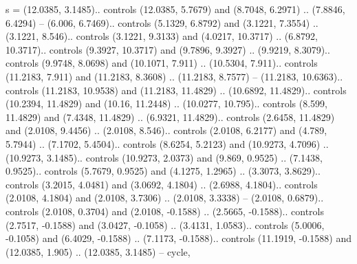 {s} = {(12.0385, 3.1485).. controls (12.0385, 5.7679) and (8.7048, 6.2971) .. (7.8846, 6.4294) -- (6.006, 6.7469).. controls (5.1329, 6.8792) and (3.1221, 7.3554) .. (3.1221, 8.546).. controls (3.1221, 9.3133) and (4.0217, 10.3717) .. (6.8792, 10.3717).. controls (9.3927, 10.3717) and (9.7896, 9.3927) .. (9.9219, 8.3079).. controls (9.9748, 8.0698) and (10.1071, 7.911) .. (10.5304, 7.911).. controls (11.2183, 7.911) and (11.2183, 8.3608) .. (11.2183, 8.7577) -- (11.2183, 10.6363).. controls (11.2183, 10.9538) and (11.2183, 11.4829) .. (10.6892, 11.4829).. controls (10.2394, 11.4829) and (10.16, 11.2448) .. (10.0277, 10.795).. controls (8.599, 11.4829) and (7.4348, 11.4829) .. (6.9321, 11.4829).. controls (2.6458, 11.4829) and (2.0108, 9.4456) .. (2.0108, 8.546).. controls (2.0108, 6.2177) and (4.789, 5.7944) .. (7.1702, 5.4504).. controls (8.6254, 5.2123) and (10.9273, 4.7096) .. (10.9273, 3.1485).. controls (10.9273, 2.0373) and (9.869, 0.9525) .. (7.1438, 0.9525).. controls (5.7679, 0.9525) and (4.1275, 1.2965) .. (3.3073, 3.8629).. controls (3.2015, 4.0481) and (3.0692, 4.1804) .. (2.6988, 4.1804).. controls (2.0108, 4.1804) and (2.0108, 3.7306) .. (2.0108, 3.3338) -- (2.0108, 0.6879).. controls (2.0108, 0.3704) and (2.0108, -0.1588) .. (2.5665, -0.1588).. controls (2.7517, -0.1588) and (3.0427, -0.1058) .. (3.4131, 1.0583).. controls (5.0006, -0.1058) and (6.4029, -0.1588) .. (7.1173, -0.1588).. controls (11.1919, -0.1588) and (12.0385, 1.905) .. (12.0385, 3.1485) -- cycle},
